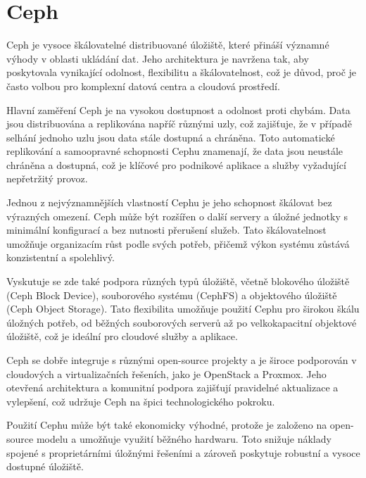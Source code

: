 \section{Ceph}

Ceph je vysoce škálovatelné distribuované úložiště, které přináší významné výhody v oblasti ukládání dat. Jeho architektura je navržena tak, aby poskytovala vynikající odolnost, flexibilitu a škálovatelnost, což je důvod, proč je často volbou pro komplexní datová centra a cloudová prostředí.

Hlavní zaměření Ceph je na vysokou dostupnost a odolnost proti chybám. Data jsou distribuována a replikována napříč různými uzly, což zajišťuje, že v případě selhání jednoho uzlu jsou data stále dostupná a chráněna. Toto automatické replikování a samoopravné schopnosti Cephu znamenají, že data jsou neustále chráněna a dostupná, což je klíčové pro podnikové aplikace a služby vyžadující nepřetržitý provoz.

Jednou z nejvýznamnějších vlastností Cephu je jeho schopnost škálovat bez výrazných omezení. Ceph může být rozšířen o další servery a úložné jednotky s minimální konfigurací a bez nutnosti přerušení služeb. Tato škálovatelnost umožňuje organizacím růst podle svých potřeb, přičemž výkon systému zůstává konzistentní a spolehlivý.

Vyskutuje se zde také podpora různých typů úložiště, včetně blokového úložiště (Ceph Block Device), souborového systému (CephFS) a objektového úložiště (Ceph Object Storage). Tato flexibilita umožňuje použití Cephu pro širokou škálu úložných potřeb, od běžných souborových serverů až po velkokapacitní objektové úložiště, což je ideální pro cloudové služby a aplikace.

Ceph se dobře integruje s různými open-source projekty a je široce podporován v cloudových a virtualizačních řešeních, jako je OpenStack a Proxmox. Jeho otevřená architektura a komunitní podpora zajišťují pravidelné aktualizace a vylepšení, což udržuje Ceph na špici technologického pokroku.

Použití Cephu může být také ekonomicky výhodné, protože je založeno na open-source modelu a umožňuje využití běžného hardwaru. Toto snižuje náklady spojené s proprietárními úložnými řešeními a zároveň poskytuje robustní a vysoce dostupné úložiště.
